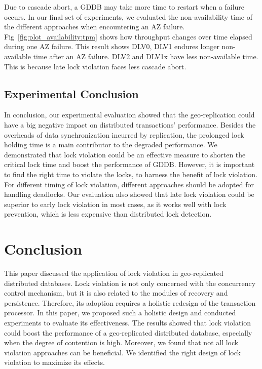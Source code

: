 \documentclass[conference]{IEEEtran}
\begin{document}
Due to cascade abort, a GDDB may take more time to restart when a failure occurs.
In our final set of experiments, we evaluated the non-availability time of the different approaches when encountering an AZ failure.
Fig~\ref{fig:plot_availability:tpm} shows how throughput changes over time elapsed during one AZ failure.
This result shows DLV0, DLV1 endures longer non-available time after an AZ failure.
DLV2 and DLV1x have less non-available time. This is because late lock violation faces less cascade abort.
\subsection{Experimental Conclusion}

In conclusion, our experimental evaluation showed that the geo-replication could have a big negative impact on distributed transactions' performance.
Besides the overheads of data synchronization incurred by replication, the prolonged lock holding time is a main contributor to the degraded performance.
We demonstrated that lock violation could be an effective measure to shorten the critical lock time and boost the performance of GDDB.
However, it is important to find the right time to violate the locks, to harness the benefit of lock violation.
For different timing of lock violation, different approaches should be adopted for handling deadlocks.
Our evaluation also showed that late lock violation could be superior to early lock violation in most cases, as it works well with lock prevention, which is less expensive than distributed lock detection.


\section{Conclusion}
\label{sec:conclusion}

This paper discussed the application of lock violation in geo-replicated distributed databases.
Lock violation is not only concerned with the concurrency control mechanism, but it is also related to the modules of recovery and persistence.
Therefore, its adoption requires a holistic redesign of the transaction processor.
In this paper, we proposed such a holistic design and conducted experiments to evaluate its effectiveness.
The results showed that lock violation could boost the performance of a geo-replicated distributed database, especially when the degree of contention is high.
Moreover, we found that not all lock violation approaches can be beneficial. We identified the right design of lock violation to maximize its effects.
\end{document}
